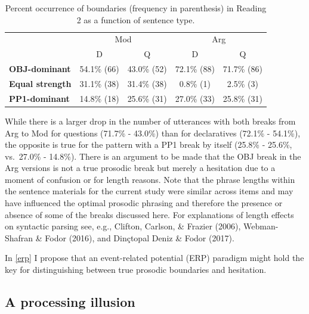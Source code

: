 \documentclass[11pt,oneside]{book}
\begin{document}
\begin{table}[!h]

\caption{\label{tab:combobr}Percent occurrence of boundaries (frequency in parenthesis) in Reading 2 as a function of sentence type.}
\centering
\begin{tabular}{>{\bfseries}lcccc}
\toprule
\multicolumn{1}{c}{ } & \multicolumn{2}{c}{Mod} & \multicolumn{2}{c}{Arg} \\
\cmidrule(l{3pt}r{3pt}){2-3} \cmidrule(l{3pt}r{3pt}){4-5}
  & D & Q & D & Q\\
\midrule
OBJ-dominant & 54.1\% (66) & 43.0\% (52) & 72.1\% (88) & 71.7\% (86)\\
Equal strength & 31.1\% (38) & 31.4\% (38) & 0.8\% (1) & 2.5\% (3)\\
PP1-dominant & 14.8\% (18) & 25.6\% (31) & 27.0\% (33) & 25.8\% (31)\\
\bottomrule
\end{tabular}
\end{table}

While there is a larger drop in the number of utterances with both breaks from Arg to Mod for questions (71.7\% - 43.0\%) than for declaratives (72.1\% - 54.1\%), the opposite is true for the pattern with a PP1 break by itself (25.8\% - 25.6\%, vs.~27.0\% - 14.8\%). There is an argument to be made that the OBJ break in the Arg versions is not a true prosodic break but merely a hesitation due to a moment of confusion or for length reasons. Note that the phrase lengths within the sentence materials for the current study were similar across items and may have influenced the optimal prosodic phrasing and therefore the presence or absence of some of the breaks discussed here. For explanations of length effects on syntactic parsing see, e.g., Clifton, Carlson, \& Frazier (2006), Webman-Shafran \& Fodor (2016), and Dinçtopal Deniz \& Fodor (2017).

In \ref{erp} I propose that an event-related potential (ERP) paradigm might hold the key for distinguishing between true prosodic boundaries and hesitation.

\hypertarget{a-processing-illusion}{%
\subsection{A processing illusion}\label{a-processing-illusion}}
\end{document}
